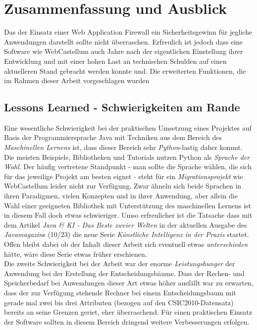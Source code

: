 \chapter{Zusammenfassung und Ausblick}



Das der Einsatz einer Web Application Firewall ein Sicherheitsgewinn für jegliche Anwendungen darstellt sollte nicht überraschen. Erfreulich ist jedoch dass eine Software wie WebCastellum auch Jahre nach der eigentlichen Einstellung ihrer Entwicklung und mit einer hohen Last an technischen Schulden auf einen aktuelleren Stand gebracht werden konnte und. Die erweiterten Funktionen, die im Rahmen dieser Arbeit vorgeschlagen wurden

\section{Lessons Learned - Schwierigkeiten am Rande}
Eine wesentliche Schwierigkeit bei der praktischen Umsetzung eines Projektes auf Basis der Programmiersprache Java mit Techniken aus dem Bereich des \emph{Maschinellen Lernens} ist, dass dieser Bereich sehr \glqq\emph{Python}\grqq-lastig daher kommt. Die meisten Beispiele, Bibliotheken und Tutorials nutzen Python als \emph{Sprache der Wahl}. Der häufig vertretene Standpunkt - man sollte die Sprache wählen, die sich für das jeweilige Projekt am besten eignet - steht für ein \emph{Migrationsprojekt} wie WebCastellum leider nicht zur Verfügung. Zwar ähneln sich beide Sprachen in ihren Paradigmen, vielen Konzepten und in ihrer Anwendung, aber allein die Wahl einer geeigneten Bibliothek mit Unterstützung des maschinellen Lernens ist in diesem Fall doch etwas schwieriger. Umso erfreulicher ist die Tatsache dass mit dem Artikel \glqq\emph{Java \& KI - Das Beste zweier Welten}\grqq{} in der aktuellen Ausgabe des \emph{Javamagazin}s (10/23) die neue Serie \glqq\emph{Künstliche Intelligenz in der Praxis}\grqq{} startet. Offen bleibt dabei ob der Inhalt dieser Arbeit sich eventuell etwas \emph{unterschieden} hätte, wäre diese Serie etwas früher erschienen.\\

Die zweite Schwierigkeit bei der Arbeit war der enorme \emph{Leistungshunger} der Anwendung bei der Erstellung der Entscheidungsbäume. Dass der Rechen- und Speicherbedarf bei Anwendungen dieser Art etwas höher ausfällt war zu erwarten, dass der zur Verfügung stehende Rechner bei einem Entscheidungsbaum mit gerade mal zwei bis drei Attributen (bezogen auf den CSIC2010-Datensatz) bereits an seine Grenzen geriet, eher überraschend. Für einen praktischen Einsatz der Software sollten in diesem Bereich dringend weitere Verbesserungen erfolgen.\\



